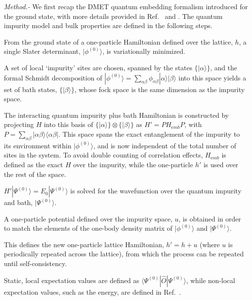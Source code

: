 \documentclass[aps,twocolumn,nobibnotes]{revtex4}
\begin{document}
\emph{Method.-} We first recap the DMET quantum embedding formalism introduced for the ground state, with more details provided in
Ref.~ and . The 
quantum impurity model and bulk properties are defined in the following steps.
\begin{inparaenum}
\item From the ground state of a one-particle Hamiltonian defined over the lattice, $h$, a single Slater determinant, $|\phi^{(0)}\rangle$, is variationally minimized.
\item A set of local `impurity' sites are chosen, spanned by the states $\{ |\alpha \rangle \}$, and the formal Schmidt decomposition of $|\phi^{(0)}\rangle = \sum_{\alpha \beta} \phi_{\alpha \beta} |\alpha \rangle |\beta \rangle$ into this space
yields a set of bath states, $\{ |\beta \rangle \}$, whose fock space is the same dimension as the impurity space.
\item The interacting quantum impurity plus bath Hamiltonian is constructed by projecting $H$ into this basis 
of $\{ | \alpha \rangle \} \otimes \{ | \beta \rangle \}$ as $H'=PH_{\mathrm emb}P$, 
with $P = \sum_{\alpha \beta} |\alpha \beta \rangle \langle \alpha \beta |$. This space spans the exact entanglement of the impurity to its environment 
within $|\phi^{(0)}\rangle$, and is now independent of the total number of sites in the system. To avoid double counting
of correlation effects, $H_{\mathrm emb}$ is defined as the exact $H$ over the impurity, while the one-particle $h'$ is used over the rest of the space.
\item $H'|\Psi^{(0)} \rangle = E_0 |\Psi^{(0)} \rangle$ is solved for the wavefunction over the quantum impurity and bath, $|\Psi^{(0)} \rangle$.
\item A one-particle potential defined over the impurity space, $u$, is obtained in order to match the elements of the one-body density matrix of $|\phi^{(0)}\rangle$ and $|\Psi^{(0)} \rangle$.
\item This defines the new one-particle lattice Hamiltonian, $h' = h + u$ (where $u$ is periodically repeated across the lattice), 
from which the process can be repeated until self-consistency.
\item Static, local expectation values are defined as $\langle \Psi^{(0)} | {\hat O} | \Psi^{(0)} \rangle$, while non-local expectation values, such as the 
energy, are defined in Ref.~.
\end{inparaenum}
\end{document}
